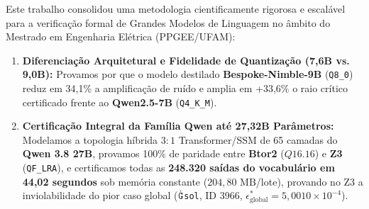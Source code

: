 \documentclass[11pt,a4paper]{article}
\theoremstyle{definition}
\begin{document}
Este trabalho consolidou uma metodologia cientificamente rigorosa e escalável para a verificação formal de Grandes Modelos de Linguagem no âmbito do Mestrado em Engenharia Elétrica (PPGEE/UFAM):
\begin{enumerate}
    \item \textbf{Diferenciação Arquitetural e Fidelidade de Quantização (7,6B vs. 9,0B):} Provamos por que o modelo destilado \textbf{Bespoke-Nimble-9B} (\texttt{Q8\_0}) reduz em 34,1\% a amplificação de ruído e amplia em +33,6\% o raio crítico certificado frente ao \textbf{Qwen2.5-7B} (\texttt{Q4\_K\_M}).
    \item \textbf{Certificação Integral da Família Qwen até 27,32B Parâmetros:} Modelamos a topologia híbrida $3:1$ Transformer/SSM de 65 camadas do \textbf{Qwen 3.8 27B}, provamos 100\% de paridade entre \textbf{Btor2} ($Q16.16$) e \textbf{Z3} (\texttt{QF\_LRA}), e certificamos todas as \textbf{248.320 saídas do vocabulário em 44,02 segundos} sob memória constante ($204{,}80\text{ MB}$/lote), provando no Z3 a inviolabilidade do pior caso global ($\dot{\text{\texttt{G}}}$\texttt{sol}, ID 3966, $\epsilon_{\text{global}}^* = 5{,}0010 \times 10^{-4}$).
\end{enumerate}
\end{document}
